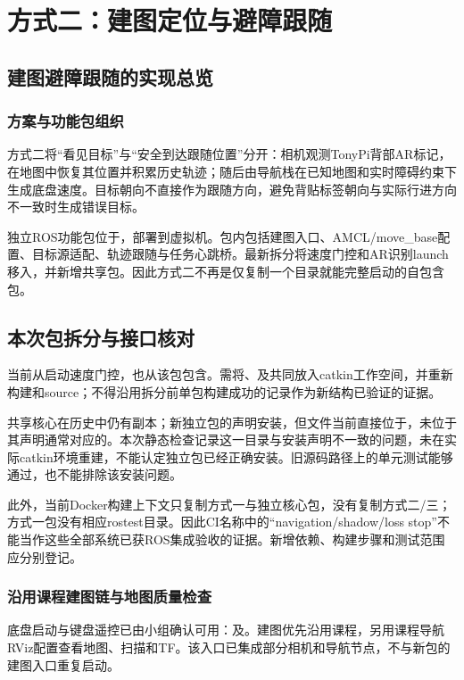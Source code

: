 \section{方式二：建图定位与避障跟随}
\subsection{建图避障跟随的实现总览}
\subsubsection{方案与功能包组织}
方式二将“看见目标”与“安全到达跟随位置”分开：相机观测TonyPi背部AR标记，在地图中恢复其位置并积累历史轨迹；随后由导航栈在已知地图和实时障碍约束下生成底盘速度。目标朝向不直接作为跟随方向，避免背贴标签朝向与实际行进方向不一致时生成错误目标。

独立ROS功能包位于，部署到虚拟机。包内包括建图入口、AMCL/move\_base配置、目标源适配、轨迹跟随与任务心跳桥。最新拆分将速度门控和AR识别launch移入，并新增共享包。因此方式二不再是仅复制一个目录就能完整启动的自包含包。

\subsection{本次包拆分与接口核对}
当前从启动速度门控，也从该包包含。需将、及共同放入catkin工作空间，并重新构建和source；不得沿用拆分前单包构建成功的记录作为新结构已验证的证据。

共享核心在历史中仍有副本；新独立包的声明安装，但文件当前直接位于，未位于其声明通常对应的。本次静态检查记录这一目录与安装声明不一致的问题，未在实际catkin环境重建，不能认定独立包已经正确安装。旧源码路径上的单元测试能够通过，也不能排除该安装问题。

此外，当前Docker构建上下文只复制方式一与独立核心包，没有复制方式二/三；方式一包没有相应rostest目录。因此CI名称中的“navigation/shadow/loss stop”不能当作这些全部系统已获ROS集成验收的证据。新增依赖、构建步骤和测试范围应分别登记。

\subsubsection{沿用课程建图链与地图质量检查}
底盘启动与键盘遥控已由小组确认可用：及。建图优先沿用课程，另用课程导航RViz配置查看地图、扫描和TF。该入口已集成部分相机和导航节点，不与新包的建图入口重复启动。

